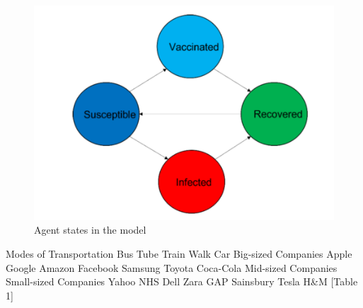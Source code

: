 \documentclass[smallextended]{svjour3}       %
\begin{document}
\begin{figure}
	\centering
	\includegraphics[width=0.5\linewidth]{figures/AgentStates.png}	
	\caption{Agent states in the model\label{fig:agentstates}}
\end{figure}

Modes
of Transportation Bus
Tube
Train
Walk
Car
Big-sized
Companies
Apple
Google
Amazon
Facebook
Samsung
Toyota
Coca-Cola
Mid-sized Companies
Small-sized
Companies
    Yahoo NHS
    Dell
Zara GAP
Sainsbury Tesla H\&M
[Table 1]

\end{document}
